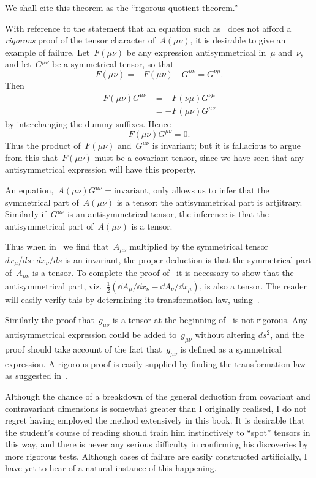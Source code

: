 \documentclass[12pt]{book}
\begin{document}
We shall cite this theorem as the ``rigorous quotient theorem.''

With reference to the statement that an equation such as~ does not afford a \emph{rigorous} proof of
the tensor character of~$A(\mu\nu)$, it is desirable to give an example of failure.
Let~$F(\mu\nu)$ be any expression antisymmetrical in~$\mu$ and~$\nu$, and let~$G^{\mu\nu}$ be a symmetrical tensor,
so that
\[
F(\mu\nu) = -F(\mu\nu) \quad G^{\mu\nu} = G^{\nu\mu}.
\]
Then
\begin{align*}
F(\mu\nu)G^{\mu\nu} & = - F(\nu\mu)G^{\nu\mu}\\
                    & = - F(\mu\nu)G^{\mu\nu}
\end{align*}
by interchanging the dummy suffixes. Hence
\[
F(\mu\nu)G^{\mu\nu} = 0.
\]
Thus the product of~$F(\mu\nu)$ and~$G^{\mu\nu}$ is invariant; but it is fallacious to argue from this
that~$F(\mu\nu)$ must be a covariant tensor, since we have seen that any antisymmetrical expression will have
this property.

An equation,~$A(\mu\nu)G^{\mu\nu} = \text{invariant}$, only allows us to infer that the
symmetrical part of~$A(\mu\nu)$ is a tensor; the antisymmetrical part is artjitrary.
Similarly if~$G^{\mu\nu}$ is an antisymmetrical tensor, the inference is that the antisymmetrical part
of~$A(\mu\nu)$ is a tensor.

Thus when in~ we find that~$A_{\mu\nu}$ multiplied by the symmetrical tensor~$dx_\mu/ds \cdot dx_\nu/ds$
is an invariant, the proper deduction is that the symmetrical part of~$A_{\mu\nu}$ is a tensor.
To complete the proof of~ it is necessary to show that the antisymmetrical part,
viz.~$\frac{1}{2}(\dd A_\mu/{\dd x_\nu} - \dd A_\nu/{\dd x_\mu})$, is also a tensor.
The reader will easily verify this by determining its transformation law, using~.

Similarly the proof that~$g_{\mu\nu}$ is a tensor at the beginning of~ is not rigorous.
Any antisymmetrical expression could be added to~$g_{\mu\nu}$ without altering $ds^2$, and the proof should take
account of the fact that~$g_{\mu\nu}$ is defined as a symmetrical expression.
A rigorous proof is easily supplied by finding the transformation law as suggested in~.

Although the chance of a breakdown of the general deduction from covariant and contravariant dimensions is somewhat
greater than I originally realised, I do not regret having employed the method extensively in this book.
It is desirable that the student's course of reading should train him instinctively to ``spot'' tensors in this way,
and there is never any serious difficulty in confirming his discoveries by more rigorous tests.
Although cases of failure are easily constructed artificially, I have yet to hear of a natural instance of this
happening.
\end{document}
